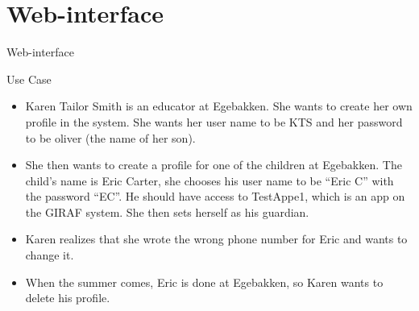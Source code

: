 \section{Web-interface}
\begin{frame}{Web-interface}
\pause
		\begin{block}{Use Case}
				\begin{itemize}
					\item Karen Tailor Smith is an educator at Egebakken. She wants to create her own profile in the system. She wants her user name to be KTS and her password to be oliver (the name of her son).
					\item She then wants to create a profile for one of the children at Egebakken. The child's name is Eric Carter, she chooses his user name to be ``Eric C'' with the password ``EC''. He should have access to TestAppe1, which is an app on the GIRAF system. She then sets herself as his guardian.
					\item Karen realizes that she wrote the wrong phone number for Eric and wants to change it.
					\item When the summer comes, Eric is done at Egebakken, so Karen wants to delete his profile.
				\end{itemize}
		\end{block}
\end{frame}